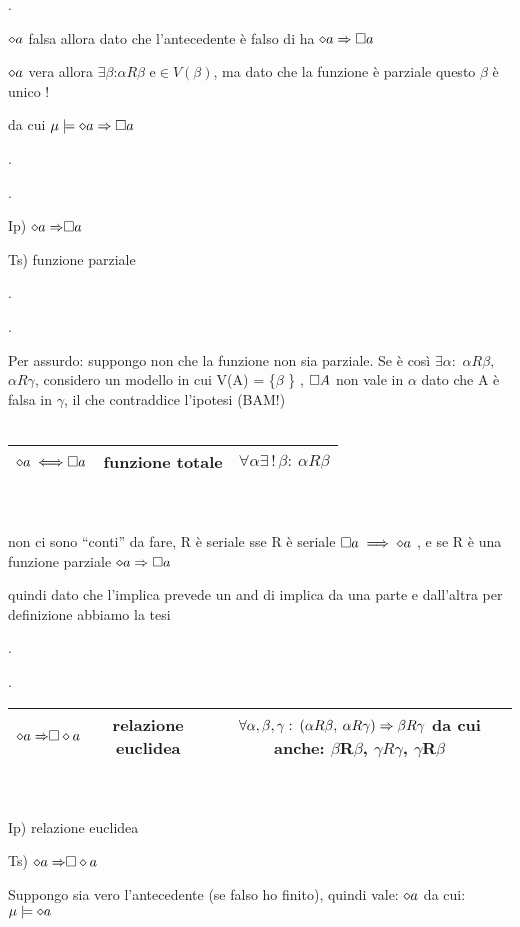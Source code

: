 .

$\diamond a$ falsa allora dato che l'antecedente è falso di ha $\diamond a\Rightarrow\square a$

$\diamond a$ vera allora $\exists\beta$:$\alpha R\beta$ e$\in V(\beta)$,
ma dato che la funzione è parziale questo $\beta$ è unico !

da cui $\mu\models\diamond a\Rightarrow\square a$

.

.

Ip) $\diamond{a\Rightarrow}\square a$

Ts) funzione parziale

.

.

Per assurdo: suppongo non che la funzione non sia parziale. Se è così
$\exists\alpha:$ $\alpha R\beta,$ $\alpha R\gamma$, considero un
modello in cui V(A) = \{$\beta$ \} , $\square A$ non vale in $\alpha$
dato che A è falsa in $\gamma$, il che contraddice l'ipotesi (BAM!)\\\\

\begin{tabular}{|c|c|c|}
\hline 
$\diamond{a\iff}\square a$  & funzione totale & $\forall\alpha\exists\,!\,\beta:\:\alpha R\beta$ \tabularnewline
\hline 
\end{tabular}\\\\

non ci sono ``conti'' da fare, R è seriale sse R è seriale $\square a\implies\diamond a$
, e se R è una funzione parziale $\diamond a\Rightarrow\square a$

quindi dato che l'implica prevede un and di implica da una parte e
dall'altra per definizione abbiamo la tesi

.

.

\begin{tabular}{|c|c|c|}
\hline 
$\diamond{a\Rightarrow}\square\diamond a$  & relazione euclidea & $\forall\alpha,\beta,\gamma:\:(\alpha R\beta,\:\alpha R\gamma)\Rightarrow\beta R\gamma$
da cui anche: $\beta$R$\beta$, $\gamma R\gamma$, $\gamma$R$\beta$\tabularnewline
\hline 
\end{tabular} \\\\

Ip) relazione euclidea

Ts) $\diamond{a\Rightarrow}\square\diamond a$ 

Suppongo sia vero l'antecedente (se falso ho finito), quindi vale:
$\diamond a$ da cui: $\mu\models\diamond a$

